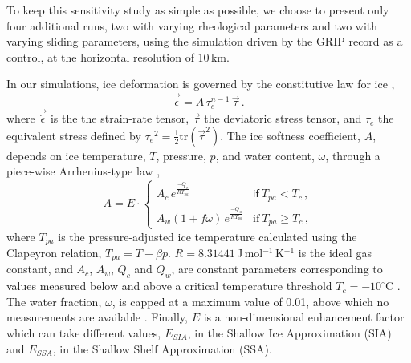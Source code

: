 To keep this sensitivity study as simple as possible, we choose to present only
four additional runs, two with varying rheological parameters and two with
varying sliding parameters, using the simulation driven by the GRIP record as
a control, at the horizontal resolution of 10\,km.

In our simulations, ice deformation is governed by the constitutive law for ice
\citep{Glen.1952, Nye.1953},
%
\begin{equation}
    \label{eqn:glenslaw}
    \vec{\dot{\epsilon}} = A\,\tau_e^{n-1}\,\vec{\tau} \,.
\end{equation}
%
where $\vec{\dot{\epsilon}}$ is the the strain-rate tensor, $\vec{\tau}$ the
deviatoric stress tensor, and $\tau_e$ the equivalent stress defined by
${\tau_e}^2 = \frac{1}{2} \mathrm{tr}(\vec{\tau}^2)$.
The ice softness coefficient, $A$, depends on ice temperature, $T$, pressure, $p$, and
water content, $\omega$, through a piece-wise Arrhenius-type law
\citep[Eqs.~63--65]{Aschwanden.etal.2012},
%
\begin{equation}
    \label{eqn:softness}
    A = E\cdot
    \left\{\begin{array}{ll}
        A_c \,e^\frac{-Q_c}{RT_{pa}}
            & \mathsf{if}\ T_{pa} < T_c \,, \\
        A_w (1+f\omega)\,e^\frac{-Q_w}{RT_{pa}}
            & \mathrm{if}\ T_{pa} \ge T_c \,,
    \end{array}\right.
\end{equation}
%
where $T_{pa}$ is the pressure-adjusted ice temperature calculated using the
Clapeyron relation, ${T_{pa} = T - \beta p}$.
$R=8.31441$\,J\,mol$^{-1}$\,K$^{-1}$ is the ideal gas constant, and $A_c$,
$A_w$, $Q_c$ and $Q_w$, are constant parameters corresponding to values
measured below and above a critical temperature threshold ${T_c=-10}^\circ$C
\citep[p.~72]{Paterson.Budd.1982,Cuffey.Paterson.2010}. The water fraction,
$\omega$, is capped at a maximum value of 0.01, above which no measurements
are available \citep[Eq.~5.7]{Lliboutry.Duval.1985, Greve.1997}. Finally,
$E$ is a non-dimensional enhancement factor which can take different values,
$E_{SIA}$, in the Shallow Ice Approximation (SIA) and $E_{SSA}$, in the Shallow
Shelf Approximation (SSA).

